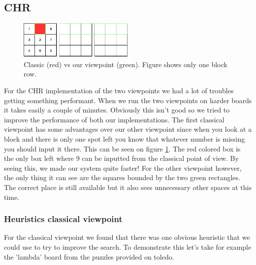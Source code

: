 \documentclass{report}
\begin{document}
\subsection{CHR}
\begin{figure}[h]
\centering
\includegraphics[width=0.5\textwidth]{classicvsour}
\caption{Classic (red) vs our viewpoint (green). Figure shows only one block row.}
\label{fig:classic_vs_own}
\end{figure}

For the CHR implementation of the two viewpoints we had a lot of troubles getting something performant. When we run the two viewpoints on harder boards it takes easily a couple of minutes. Obviously this isn't good so we tried to improve the performance of both our implementations. The first classical viewpoint has some advantages over our other viewpoint since when you look at a block and there is only one spot left you know that whatever number is missing you should input it there. This can be seen on figure \ref{fig:classic_vs_own}. The red colored box is the only box left where 9 can be inputted from the classical point of view. By seeing this, we made our system quite faster! For the other viewpoint however, the only thing it can see are the squares bounded by the two green rectangles. The correct place is still available but it also sees unnecessary other spaces at this time.

\subsubsection{Heuristics classical viewpoint}
For the classical viewpoint we found that there was one obvious heuristic that we could use to try to improve the search.
To demonstrate this let's take for example the 'lambda' board from the puzzles provided on toledo. 
\end{document}
